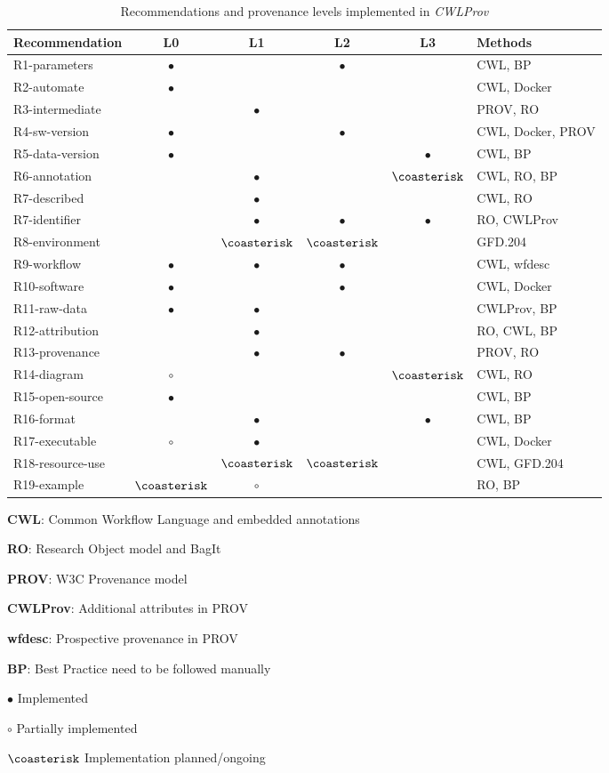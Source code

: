 \documentclass[a4paper,num-refs]{oup-contemporary}
\begin{document}
\begin{table}[bt!]
\caption{Recommendations and provenance levels implemented in \textit{CWLProv}} \label{tab:fulfilling}
\begin{tabular}{l c c c c l}
\toprule 
Recommendation  & L0 & L1 & L2 & L3 & Methods \\
\midrule
R1-parameters   & $\bullet$ && $\bullet$ && CWL, BP \\
R2-automate     & $\bullet$ &&&& CWL, Docker \\
R3-intermediate && $\bullet$ &&& PROV, RO \\
R4-sw-version   & $\bullet$ && $\bullet$ && CWL, Docker, PROV \\
R5-data-version & $\bullet$ &&& $\bullet$ & CWL, BP\\
R6-annotation   && $\bullet$ && $\coasterisk$ & CWL, RO, BP \\
R7-described    && $\bullet$ &&& CWL, RO\\
R7-identifier   && $\bullet$ & $\bullet$ & $\bullet$ & RO, CWLProv\\
R8-environment  && $\coasterisk$& $\coasterisk$ && GFD.204 \\
R9-workflow    & $\bullet$ & $\bullet$ & $\bullet$ && CWL, wfdesc \\
R10-software    & $\bullet$ && $\bullet$ && CWL, Docker \\
R11-raw-data    & $\bullet$ & $\bullet$ &&& CWLProv, BP \\
R12-attribution & & $\bullet$ &&& RO, CWL, BP \\
R13-provenance  & & $\bullet$ & $\bullet$ && PROV, RO \\
R14-diagram      & $\circ$ &&& $\coasterisk$ & CWL, RO \\
R15-open-source & $\bullet$ &&&& CWL, BP \\
R16-format      & & $\bullet$ && $\bullet$ & CWL, BP \\
R17-executable  & $\circ$ & $\bullet$ &&& CWL, Docker \\
R18-resource-use & & $\coasterisk$ & $\coasterisk$ && CWL, GFD.204 \\
R19-example      & $\coasterisk$ & $\circ$ &&& RO, BP \\
\bottomrule
\end{tabular}
\begin{tablenotes}
\item \textbf{CWL}: Common Workflow Language and embedded annotations
\item \textbf{RO}: Research Object model and BagIt
\item \textbf{PROV}: W3C Provenance model
\item \textbf{CWLProv}: Additional attributes in PROV
\item \textbf{wfdesc}: Prospective provenance in PROV
\item \textbf{BP}: Best Practice need to be followed manually
\item $\bullet$ Implemented
\item $\circ$ Partially implemented
\item $\coasterisk$ Implementation planned/ongoing
\end{tablenotes}
\end{table}
\end{document}
